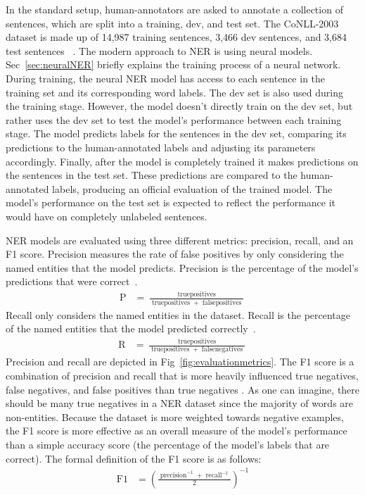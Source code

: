 In the standard setup, human-annotators are asked to annotate a collection of sentences, which are split into a training, dev, and test set. The CoNLL-2003 dataset is made up of 14,987 training sentences, 3,466 dev sentences, and 3,684 test sentences ~\citep{conll}. The modern approach to NER is using neural models. Sec~\ref{sec:neuralNER} briefly explains the training process of a neural network. During training, the neural NER model has access to each sentence in the training set and its corresponding word labels. The dev set is also used during the training stage. However, the model doesn't directly train on the dev set, but rather uses the dev set to test the model's performance between each training stage. The model predicts labels for the sentences in the dev set, comparing its predictions to the human-annotated labels and adjusting its parameters accordingly. Finally, after the model is completely trained it makes predictions on the sentences in the test set. These predictions are compared to the human-annotated labels, producing an official evaluation of the trained model. The model's performance on the test set is expected to reflect the performance it would have on completely unlabeled sentences.

NER models are evaluated using three different metrics: precision, recall, and an F1 score. Precision measures the rate of false positives by only considering the named entities that the model predicts. Precision is the percentage of the model's predictions that were correct~\citep{conll}. 
{
    {
        \begin{align*} 
            \operatorname{P} &= \frac{\operatorname{true positives}}{\operatorname{true positives} + \operatorname{false positives}}
        \end{align*} 
    }
}
Recall only considers the named entities in the dataset. Recall is the percentage of the named entities that the model predicted correctly~\citep{conll}. 
{
    {
        \begin{align*} 
            \operatorname{R} &= \frac{\operatorname{true positives}}{\operatorname{true positives} + \operatorname{false negatives}}
        \end{align*} 
    }
}
Precision and recall are depicted in Fig~\ref{fig:evaluationmetrics}. The F1 score is a combination of precision and recall that is more heavily influenced true negatives, false negatives, and false positives than true negatives \citep{NERevaluationmetrics}. As one can imagine, there should be many true negatives in a NER dataset since the majority of words are non-entities. Because the dataset is more weighted towards negative examples, the F1 score is more effective as an overall measure of the model's performance than a simple accuracy score (the percentage of the model's labels that are correct). The formal definition of the F1 score is as follows:
{
    {
        \begin{align*} 
            \operatorname{F1} &= {(\frac{\operatorname{precision}^{-1} + \operatorname{recall}^{-1}}{2})}^{-1}
        \end{align*} 
    }
}


